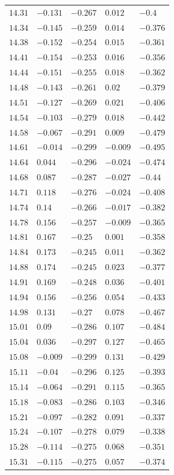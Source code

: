 \begin{table}[h]
\begin{tabular}{rllll}
$14.31$&$-0.131$&$-0.267$&$0.012$&$-0.4$\\
$14.34$&$-0.145$&$-0.259$&$0.014$&$-0.376$\\
$14.38$&$-0.152$&$-0.254$&$0.015$&$-0.361$\\
$14.41$&$-0.154$&$-0.253$&$0.016$&$-0.356$\\
$14.44$&$-0.151$&$-0.255$&$0.018$&$-0.362$\\
$14.48$&$-0.143$&$-0.261$&$0.02$&$-0.379$\\
$14.51$&$-0.127$&$-0.269$&$0.021$&$-0.406$\\
$14.54$&$-0.103$&$-0.279$&$0.018$&$-0.442$\\
$14.58$&$-0.067$&$-0.291$&$0.009$&$-0.479$\\
$14.61$&$-0.014$&$-0.299$&$-0.009$&$-0.495$\\
$14.64$&$0.044$&$-0.296$&$-0.024$&$-0.474$\\
$14.68$&$0.087$&$-0.287$&$-0.027$&$-0.44$\\
$14.71$&$0.118$&$-0.276$&$-0.024$&$-0.408$\\
$14.74$&$0.14$&$-0.266$&$-0.017$&$-0.382$\\
$14.78$&$0.156$&$-0.257$&$-0.009$&$-0.365$\\
$14.81$&$0.167$&$-0.25$&$0.001$&$-0.358$\\
$14.84$&$0.173$&$-0.245$&$0.011$&$-0.362$\\
$14.88$&$0.174$&$-0.245$&$0.023$&$-0.377$\\
$14.91$&$0.169$&$-0.248$&$0.036$&$-0.401$\\
$14.94$&$0.156$&$-0.256$&$0.054$&$-0.433$\\
$14.98$&$0.131$&$-0.27$&$0.078$&$-0.467$\\
$15.01$&$0.09$&$-0.286$&$0.107$&$-0.484$\\
$15.04$&$0.036$&$-0.297$&$0.127$&$-0.465$\\
$15.08$&$-0.009$&$-0.299$&$0.131$&$-0.429$\\
$15.11$&$-0.04$&$-0.296$&$0.125$&$-0.393$\\
$15.14$&$-0.064$&$-0.291$&$0.115$&$-0.365$\\
$15.18$&$-0.083$&$-0.286$&$0.103$&$-0.346$\\
$15.21$&$-0.097$&$-0.282$&$0.091$&$-0.337$\\
$15.24$&$-0.107$&$-0.278$&$0.079$&$-0.338$\\
$15.28$&$-0.114$&$-0.275$&$0.068$&$-0.351$\\
$15.31$&$-0.115$&$-0.275$&$0.057$&$-0.374$\\

\end{tabular}
\end{table}
